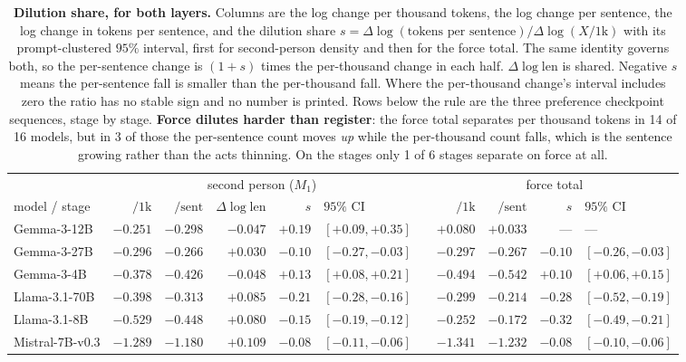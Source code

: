 \begin{table}[tb]\centering\scriptsize\setlength{\tabcolsep}{2pt}
\caption{\textbf{Dilution share, for both layers.} Columns are the log change per thousand tokens, the log change per sentence, the log change in tokens per sentence, and the dilution share $s=\Delta\log(\text{tokens per sentence})/\Delta\log(X/\mathrm{1k})$ with its prompt-clustered $95\%$ interval, first for second-person density and then for the force total. The same identity governs both, so the per-sentence change is $(1+s)$ times the per-thousand change in each half. $\Delta\log\mathrm{len}$ is shared. Negative $s$ means the per-sentence fall is smaller than the per-thousand fall. Where the per-thousand change's interval includes zero the ratio has no stable sign and no number is printed. Rows below the rule are the three preference checkpoint sequences, stage by stage. \textbf{Force dilutes harder than register}: the force total separates per thousand tokens in 14 of 16 models, but in 3 of those the per-sentence count moves \emph{up} while the per-thousand count falls, which is the sentence growing rather than the acts thinning. On the stages only 1 of 6 stages separate on force at all.}
\label{tab:dilution}
\begin{tabular}{lrrrrlcrrrl}
\toprule
 & \multicolumn{5}{c}{second person ($M_1$)} & & \multicolumn{4}{c}{force total} \\
\cmidrule(lr){2-6}\cmidrule(lr){8-11}
model / stage & $/\mathrm{1k}$ & $/\mathrm{sent}$ & $\Delta\log\mathrm{len}$ & $s$ & $95\%$ CI & & $/\mathrm{1k}$ & $/\mathrm{sent}$ & $s$ & $95\%$ CI \\
\midrule
Gemma-3-12B & $-0.251$ & $-0.298$ & $-0.047$ & $+0.19$ & $[+0.09,+0.35]$ & & $+0.080$ & $+0.033$ & --- & --- \\
Gemma-3-27B & $-0.296$ & $-0.266$ & $+0.030$ & $-0.10$ & $[-0.27,-0.03]$ & & $-0.297$ & $-0.267$ & $-0.10$ & $[-0.26,-0.03]$ \\
Gemma-3-4B & $-0.378$ & $-0.426$ & $-0.048$ & $+0.13$ & $[+0.08,+0.21]$ & & $-0.494$ & $-0.542$ & $+0.10$ & $[+0.06,+0.15]$ \\
Llama-3.1-70B & $-0.398$ & $-0.313$ & $+0.085$ & $-0.21$ & $[-0.28,-0.16]$ & & $-0.299$ & $-0.214$ & $-0.28$ & $[-0.52,-0.19]$ \\
Llama-3.1-8B & $-0.529$ & $-0.448$ & $+0.080$ & $-0.15$ & $[-0.19,-0.12]$ & & $-0.252$ & $-0.172$ & $-0.32$ & $[-0.49,-0.21]$ \\
Mistral-7B-v0.3 & $-1.289$ & $-1.180$ & $+0.109$ & $-0.08$ & $[-0.11,-0.06]$ & & $-1.341$ & $-1.232$ & $-0.08$ & $[-0.10,-0.06]$ \\

\end{tabular}
\end{table}

